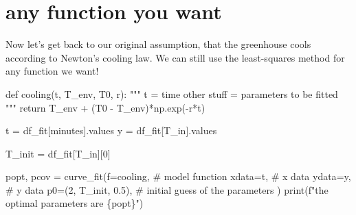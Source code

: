 \documentclass[
  letterpaper,
  DIV=11,
  numbers=noendperiod,
  oneside]{scrreprt}
\newenvironment{Shaded}{\begin{snugshade}}{\end{snugshade}}
\newcommand{\BuiltInTok}[1]{\textcolor[rgb]{0.00,0.23,0.31}{#1}}
\newcommand{\CommentTok}[1]{\textcolor[rgb]{0.37,0.37,0.37}{#1}}
\newcommand{\ControlFlowTok}[1]{\textcolor[rgb]{0.00,0.23,0.31}{#1}}
\newcommand{\DecValTok}[1]{\textcolor[rgb]{0.68,0.00,0.00}{#1}}
\newcommand{\FloatTok}[1]{\textcolor[rgb]{0.68,0.00,0.00}{#1}}
\newcommand{\KeywordTok}[1]{\textcolor[rgb]{0.00,0.23,0.31}{#1}}
\newcommand{\NormalTok}[1]{\textcolor[rgb]{0.00,0.23,0.31}{#1}}
\newcommand{\OperatorTok}[1]{\textcolor[rgb]{0.37,0.37,0.37}{#1}}
\newcommand{\SpecialCharTok}[1]{\textcolor[rgb]{0.37,0.37,0.37}{#1}}
\newcommand{\SpecialStringTok}[1]{\textcolor[rgb]{0.13,0.47,0.30}{#1}}
\newcommand{\StringTok}[1]{\textcolor[rgb]{0.13,0.47,0.30}{#1}}
\begin{document}
\hypertarget{any-function-you-want}{%
\section{any function you want}\label{any-function-you-want}}

Now let's get back to our original assumption, that the greenhouse cools
according to Newton's cooling law. We can still use the least-squares
method for any function we want!

\begin{Shaded}
\begin{Highlighting}[]
\KeywordTok{def}\NormalTok{ cooling(t, T\_env, T0, r):}
    \CommentTok{"""}
\CommentTok{    t = time}
\CommentTok{    other stuff = parameters to be fitted}
\CommentTok{    """}
    \ControlFlowTok{return}\NormalTok{ T\_env }\OperatorTok{+}\NormalTok{ (T0 }\OperatorTok{{-}}\NormalTok{ T\_env)}\OperatorTok{*}\NormalTok{np.exp(}\OperatorTok{{-}}\NormalTok{r}\OperatorTok{*}\NormalTok{t)}
\end{Highlighting}
\end{Shaded}

\begin{Shaded}
\begin{Highlighting}[]
\NormalTok{t }\OperatorTok{=}\NormalTok{ df\_fit[}\StringTok{\textquotesingle{}minutes\textquotesingle{}}\NormalTok{].values}
\NormalTok{y }\OperatorTok{=}\NormalTok{ df\_fit[}\StringTok{\textquotesingle{}T\_in\textquotesingle{}}\NormalTok{].values}

\NormalTok{T\_init }\OperatorTok{=}\NormalTok{ df\_fit[}\StringTok{\textquotesingle{}T\_in\textquotesingle{}}\NormalTok{][}\DecValTok{0}\NormalTok{]}

\NormalTok{popt, pcov }\OperatorTok{=}\NormalTok{ curve\_fit(f}\OperatorTok{=}\NormalTok{cooling,             }\CommentTok{\# model function}
\NormalTok{                     xdata}\OperatorTok{=}\NormalTok{t,                 }\CommentTok{\# x data}
\NormalTok{                     ydata}\OperatorTok{=}\NormalTok{y,                 }\CommentTok{\# y data}
\NormalTok{                     p0}\OperatorTok{=}\NormalTok{(}\DecValTok{2}\NormalTok{, T\_init, }\FloatTok{0.5}\NormalTok{),     }\CommentTok{\# initial guess of the parameters}
\NormalTok{                     )}
\BuiltInTok{print}\NormalTok{(}\SpecialStringTok{f"the optimal parameters are }\SpecialCharTok{\{}\NormalTok{popt}\SpecialCharTok{\}}\SpecialStringTok{"}\NormalTok{)}
\end{Highlighting}
\end{Shaded}
\end{document}
